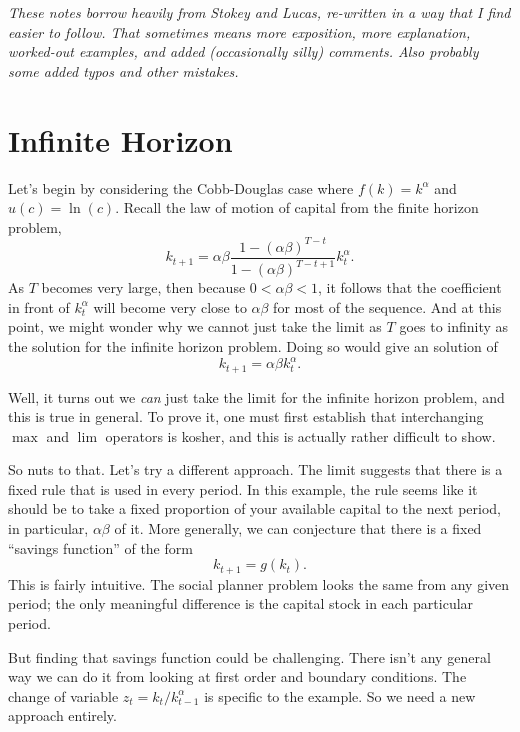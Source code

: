 \documentclass[12pt]{article}
\theoremstyle{definition}
\begin{document}
\maketitle
\singlespace

\noindent \emph{These notes borrow heavily from Stokey and Lucas, re-written in a way that I find easier to follow. That sometimes means more exposition, more explanation, worked-out examples, and added (occasionally silly) comments. Also probably some added typos and other mistakes. }



\section{Infinite Horizon}
Let's begin by considering the Cobb-Douglas case where $f(k)=k^{\alpha}$ and $u(c)=\ln(c)$. Recall the law of motion of capital from the finite horizon problem,
\begin{equation}
	k_{t+1} = \alpha \beta \frac{ 1 - (\alpha \beta)^{T -t}}{ 1 - (\alpha \beta)^{T -t +1}}k^{\alpha}_{t}. \label{cdlomoc} 
\end{equation}
As $T$ becomes very large, then because $0 < \alpha \beta < 1$, it follows that the coefficient in front of $k_t^{\alpha}$ will become very close to $\alpha \beta$ for most of the sequence. And at this point, we might wonder why we cannot just take the limit as $T$ goes to infinity as the solution for the infinite horizon problem. Doing so would give an solution of
	\[k_{t+1} = \alpha \beta k_t^{\alpha}.	\]

Well, it turns out we \emph{can} just take the limit for the infinite horizon problem, and this is true in general. To prove it, one must first establish that  interchanging $\max$ and $\lim$ operators  is kosher, and this is actually rather difficult to show. 

So nuts to that. Let's try a different approach. The limit suggests that there is a fixed rule that is used in every period. In this example, the rule seems like it should be to take a fixed proportion of your available capital to the next period, in particular, $\alpha \beta$ of it. More generally, we can conjecture that there is a fixed ``savings function'' of the form
	\[	k_{t+1} = g(k_t).	\]
This is fairly intuitive. The social planner problem looks the same from any given period; the only meaningful difference is the capital stock in each particular period. 

But finding that savings function could be challenging. There isn't any general way we can do it from looking at first order and boundary conditions. The change of variable $z_t = k_t / k_{t-1}^{\alpha}$ is specific to the example. So we need a new approach entirely. 
\end{document}
